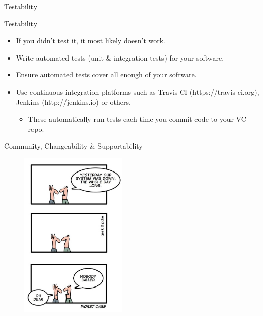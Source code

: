 \documentclass[compress]{beamer}
\begin{document}
\begin{frame}{Testability}
    \begin{block}{Testability}
        \begin{itemize}
        \item If you didn't test it, it most likely doesn't work.
        \item Write automated tests (unit \& integration tests) for your software.
        \item Ensure automated tests cover all enough of your software.
        \item Use continuous integration platforms such as Travis-CI (https://travis-ci.org), Jenkins (http://jenkins.io) or others.
            \begin{itemize}
                \item These automatically run tests each time you commit code to your VC repo.
            \end{itemize}
        \end{itemize}
    \end{block}
\end{frame}

\begin{frame}{Community, Changeability \& Supportability}
\begin{figure}
\includegraphics[height=8cm]{img/community.jpg}
\end{figure}
\end{frame}
\end{document}
